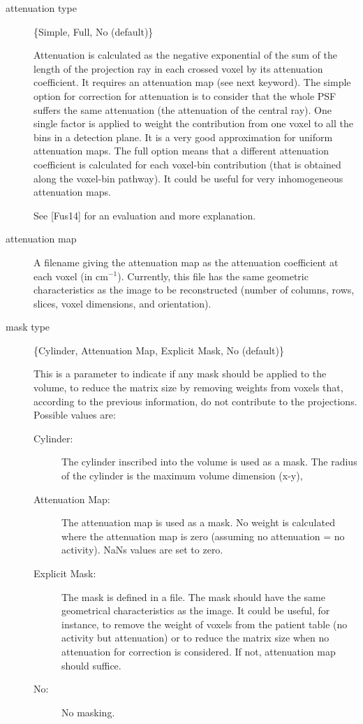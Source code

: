 \documentclass{article}
\begin{document}
{{\begin{description}
\item[attenuation type] \{Simple, Full, No (default)\}

Attenuation is calculated as the negative exponential of the sum of the length of the projection ray in each crossed voxel by its attenuation coefficient. It requires an attenuation map (see next keyword). The simple option for correction for attenuation is to consider that the whole PSF suffers the same attenuation (the attenuation of the central ray). One single factor is applied to weight the contribution from one voxel to all the bins in a detection plane. It is a very good approximation for uniform attenuation maps. The full option means that a different attenuation coefficient is calculated for each voxel-bin contribution (that is obtained along the voxel-bin pathway). It could be useful for very inhomogeneous attenuation maps.

See [Fus14] for an evaluation and more explanation.

\item[attenuation map] \hfill

A filename giving the attenuation map as the attenuation coefficient at each voxel (in $\mathrm{cm}^{-1}$). Currently, this file has the same geometric characteristics as the image to be reconstructed (number of columns, rows, slices, voxel dimensions, and orientation).

\item[mask type] \{Cylinder, Attenuation Map, Explicit Mask, No (default)\}

This is a parameter to indicate if any mask should be applied to the volume, to reduce the matrix size by removing weights from voxels that, according to the previous information, do not contribute to the projections. Possible values are:
\begin{description}
\item[Cylinder:] The cylinder inscribed into the volume is used as a mask. The radius of the cylinder is the maximum volume dimension (x-y),
\item[Attenuation Map:] The attenuation map is used as a mask. No weight is calculated where the attenuation map is zero (assuming no attenuation = no activity). NaNs values are set to zero.
\item[Explicit Mask:] The mask is defined in a file. The mask should have the same geometrical characteristics as the image. It could be useful, for instance, to remove the weight of voxels from the patient table (no activity but attenuation) or to reduce the matrix size when no attenuation for correction is considered. If not, attenuation map should suffice.
\item[No:] No masking.
\end{description}


\end{description}}}
\end{document}
